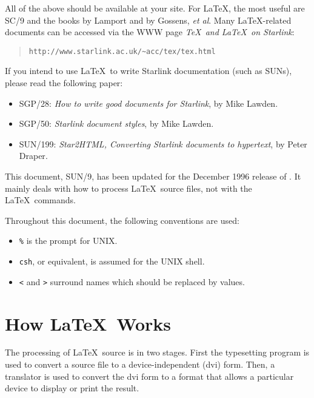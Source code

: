 \documentclass[11pt,twoside]{article}
\newcommand{\htmladdnormallink}[2]{#1}
\newcommand{\xref}[3]{#1}
\newcommand{\xlabel}[1]{}
\begin{document}
All of the above should be available at your site.
For \LaTeX, the most useful are SC/9
and the books by Lamport and by Gossens, \emph{et al}.
Many \LaTeX-related documents can be accessed via the WWW page 
\emph{\TeX\ and \LaTeX\ on Starlink}:

\begin{quote}
      \htmladdnormallink{\texttt{http://www.starlink.ac.uk/\~{}acc/tex/tex.html}}
      {http://www.starlink.ac.uk/\~{}acc/tex/tex.html}
\end{quote}

If you intend to use \LaTeX\ to write Starlink documentation (such as SUNs), 
please read the following paper:
\begin{itemize}
  \item \xref{SGP/28: 
         \emph{How to write good documents for Starlink}}{sgp28}{},
         by Mike Lawden\cite{sgp28}.
  \item \xref{SGP/50: 
         \emph{Starlink document styles}}{sgp50}{},
         by Mike Lawden\cite{sgp50}.
  \item \xref{SUN/199: 
         \emph{Star2HTML, Converting Starlink documents to hypertext}}{sun199}{},
         by Peter Draper\cite{sun199}.
\end{itemize}

This document, SUN/9, has been updated for the December 1996 release of \LaTeXe.
It mainly deals with how to process \LaTeX\
source files, not with the \LaTeX\ commands.

Throughout this document, the following conventions are used:

\begin{itemize}
  \item \texttt{\%} is the prompt for UNIX.
  \item \texttt{csh}, or equivalent, is assumed for the UNIX shell.
  \item \texttt{<} and \texttt{>} surround names which should be replaced
        by values.
\end{itemize}

\section{\xlabel{how_latex_works}\label{how_latex_works}How \LaTeX\ Works}

The processing of \LaTeX\ source is in two stages. First the
typesetting program is used to convert a source file to a device-independent
(dvi) form. Then, a translator is used to convert the dvi form to a format that
allows a particular device to display or print the result.
\end{document}
